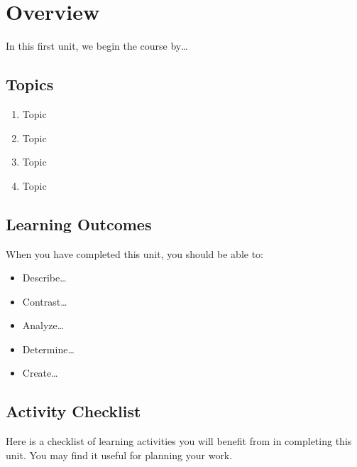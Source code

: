 \documentclass[
]{book}
\providecommand{\tightlist}{%
  \setlength{\itemsep}{0pt}\setlength{\parskip}{0pt}}
\begin{document}
\hypertarget{overview-11}{%
\section*{Overview}\label{overview-11}}

In this first unit, we begin the course by\ldots{}

\hypertarget{topics-11}{%
\subsection*{Topics}\label{topics-11}}

\begin{enumerate}
\def\labelenumi{\arabic{enumi}.}
\tightlist
\item
  Topic\\
\item
  Topic\\
\item
  Topic\\
\item
  Topic
\end{enumerate}

\hypertarget{learning-outcomes-11}{%
\subsection*{Learning Outcomes}\label{learning-outcomes-11}}

When you have completed this unit, you should be able to:

\begin{itemize}
\tightlist
\item
  Describe\ldots{}
\item
  Contrast\ldots{}
\item
  Analyze\ldots{}
\item
  Determine\ldots{}
\item
  Create\ldots{}
\end{itemize}

\hypertarget{activity-checklist-11}{%
\subsection*{Activity Checklist}\label{activity-checklist-11}}

Here is a checklist of learning activities you will benefit from in completing this unit. You may find it useful for planning your work.
\end{document}
